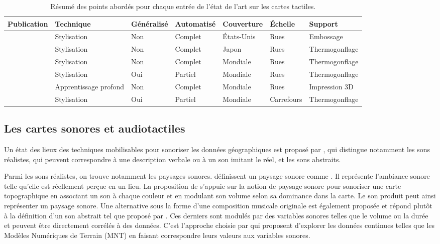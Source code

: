 \begin{table}[ht]
\begin{center}
\scriptsize
\begin{tabular}{ | l | l | l | l | l | l | l | }
    Publication & Technique & Généralisé & Automatisé & Couverture & Échelle & Support \tabularnewline
    \hline
    \citep{Miele2004} & Stylisation & Non & Complet & États-Unis & Rues & Embossage \tabularnewline
    \citep{Minatani2010} & Stylisation & Non & Complet & Japon & Rues & Thermogonflage \tabularnewline
    \citep{Watanabe2014, Cervenka2016} & Stylisation & Non & Complet & Mondiale & Rues & Thermogonflage \tabularnewline
    \citep{Stampach2016} & Stylisation & Oui & Partiel & Mondiale & Rues & Thermogonflage \tabularnewline
    \citep{FillieresRiveau2020} & Apprentissage profond & Non & Complet & Mondiale & Rues & Impression 3D \tabularnewline
    \citep{Jiang2023} & Stylisation & Oui & Partiel & Mondiale & Carrefours & Thermogonflage \tabularnewline
\end{tabular}
\end{center}
\caption[Résumé de l'état de l'art sur la génération de cartes en relief]{Résumé des points abordés pour chaque entrée de l'état de l'art sur les cartes tactiles.}
\label{tab:ea_relief}
\end{table}


\label{ea_cartetactile}

\subsection{Les cartes sonores et audiotactiles}

\label{ea_cartessonores}

Un état des lieux des techniques mobilisables pour sonoriser les données géographiques est proposé par \citet{Krygier1994}, qui distingue notamment les sons réalistes, qui peuvent correspondre à une description verbale ou à un son imitant le réel, et les sons abstraits.

\newpar{}


Parmi les sons réalistes, on trouve notamment les paysages sonores. \citet{Porteous1985} définissent un paysage sonore comme . Il représente l'ambiance sonore telle qu'elle est réellement perçue en un lieu. La proposition de \citet{Josselin2016} s'appuie sur la notion de paysage sonore pour sonoriser une carte topographique en associant un son à chaque couleur et en modulant son volume selon sa dominance dans la carte. Le son produit peut ainsi représenter un paysage sonore. Une alternative sous la forme d'une composition musicale originale est également proposée et répond plutôt à la définition d'un son abstrait tel que proposé par \citet{Krygier1994}. Ces derniers sont  modulés par des variables sonores telles que le volume ou la durée et peuvent être directement corrélés à des données. C'est l'approche choisie par \citet{Schito2018} qui proposent d'explorer les données continues telles que les Modèles Numériques de Terrain (MNT) en faisant correspondre leurs valeurs aux variables sonores.

